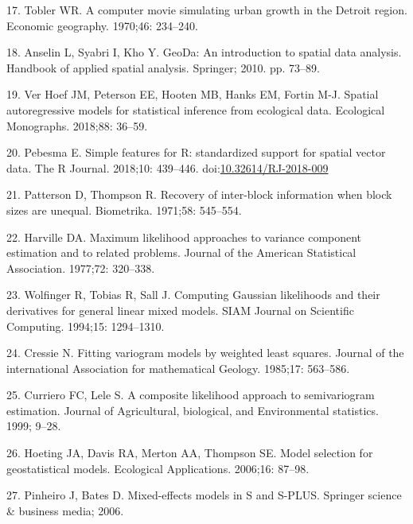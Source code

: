 \documentclass[10pt,letterpaper]{article}
\begin{document}
\leavevmode\hypertarget{ref-tobler1970computer}{}%
17. Tobler WR. A computer movie simulating urban growth in the Detroit
region. Economic geography. 1970;46: 234--240.

\leavevmode\hypertarget{ref-anselin2010geoda}{}%
18. Anselin L, Syabri I, Kho Y. GeoDa: An introduction to spatial data
analysis. Handbook of applied spatial analysis. Springer; 2010. pp.
73--89.

\leavevmode\hypertarget{ref-ver2018spatial}{}%
19. Ver Hoef JM, Peterson EE, Hooten MB, Hanks EM, Fortin M-J. Spatial
autoregressive models for statistical inference from ecological data.
Ecological Monographs. 2018;88: 36--59.

\leavevmode\hypertarget{ref-pebesma2018sf}{}%
20. Pebesma E. Simple features for R: standardized support for spatial
vector data. The R Journal. 2018;10: 439--446.
doi:\href{https://doi.org/10.32614/RJ-2018-009}{10.32614/RJ-2018-009}

\leavevmode\hypertarget{ref-patterson1971recovery}{}%
21. Patterson D, Thompson R. Recovery of inter-block information when
block sizes are unequal. Biometrika. 1971;58: 545--554.

\leavevmode\hypertarget{ref-harville1977maximum}{}%
22. Harville DA. Maximum likelihood approaches to variance component
estimation and to related problems. Journal of the American Statistical
Association. 1977;72: 320--338.

\leavevmode\hypertarget{ref-wolfinger1994computing}{}%
23. Wolfinger R, Tobias R, Sall J. Computing Gaussian likelihoods and
their derivatives for general linear mixed models. SIAM Journal on
Scientific Computing. 1994;15: 1294--1310.

\leavevmode\hypertarget{ref-cressie1985fitting}{}%
24. Cressie N. Fitting variogram models by weighted least squares.
Journal of the international Association for mathematical Geology.
1985;17: 563--586.

\leavevmode\hypertarget{ref-curriero1999composite}{}%
25. Curriero FC, Lele S. A composite likelihood approach to
semivariogram estimation. Journal of Agricultural, biological, and
Environmental statistics. 1999; 9--28.

\leavevmode\hypertarget{ref-hoeting2006model}{}%
26. Hoeting JA, Davis RA, Merton AA, Thompson SE. Model selection for
geostatistical models. Ecological Applications. 2006;16: 87--98.

\leavevmode\hypertarget{ref-pinheiro2006mixed}{}%
27. Pinheiro J, Bates D. Mixed-effects models in S and S-PLUS. Springer
science \& business media; 2006.
\end{document}
